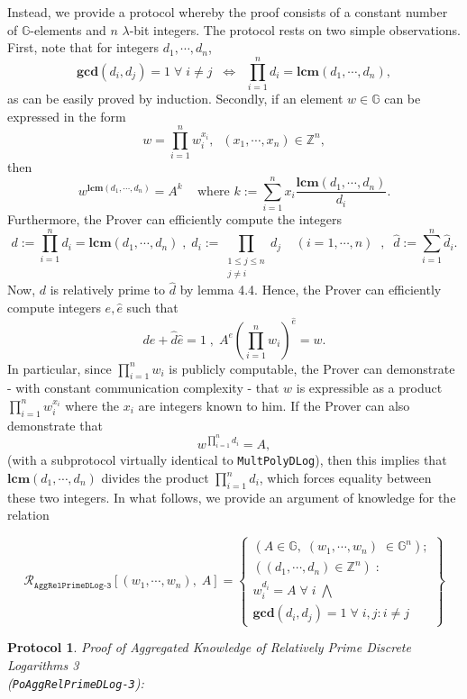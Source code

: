 \documentclass[11pt, lettersize, notitlepage, leqno, footskip=0.6cm]{article}
\newcommand{\bz}{\mathbb Z}
\newcommand{\pl}{\prod\limits}
\newcommand{\slim}{\sum\limits}
\newcommand{\ttt}{\texttt}
\newcommand{\LRA}{\Longleftrightarrow}
\newcommand{\mc}{\mathcal}
\newcommand{\mb}{\mathbb}
\newcommand{\mbf}{\mathbf}
\newcommand{\lam}{\lambda}
\newcommand{\what}{\widehat}
\newcommand{\vs}{\vspace{-0.15cm}}
\newcommand{\LCM}{\mbf{lcm}}
\newcommand{\GCD}{\mbf{gcd}}
\newtheorem{Prot}[Thm]{Protocol}
\numberwithin{equation}{section}
\begin{document}
Instead, we provide a protocol whereby the proof consists of a constant number of $\mb{G}$-elements and $n$ $\lam$-bit integers. The protocol rests on two simple observations. First, note that for integers $d_1,\cdots,d_n$, \vs $$\GCD(d_i,d_j)=1\;\forall\;i\neq j\;\; \LRA\;\; \pl_{i=1}^n d_i= \LCM(d_1,\cdots,d_n),$$ as can be easily proved by induction. Secondly, if an element $w\in \mb{G}$ can be expressed in the form \vspace{-0.15cm}$$w = \prod\limits_{i=1}^n w_i^{x_i},\;\;(x_1,\cdots,x_n)\in\bz^n,$$ then \vs $$w^{\LCM(d_1,\cdots,d_n)} = A^{k} \;\;\;\text{ where } k := \slim_{i=1}^n x_i\frac{\LCM(d_1,\cdots,d_n)}{d_i}.$$ Furthermore, the Prover can efficiently compute the integers \vs $$d:= \pl_{i=1}^n d_i = \LCM(d_1,\cdots,d_n)\;,\;\what{d}_i:= \pl_{\substack{1\leq j\leq n\\ j\neq i}} d_j\;\;\;\; (i=1,\cdots,n)\;\;,\;\; \what{d} := \slim_{i=1}^n \what{d}_i.$$ Now, $d$ is relatively prime to $\what{d}$ by lemma 4.4. Hence, the Prover can efficiently compute integers $e,\what{e}$ such that $$de+\what{d}\what{e} = 1\;,\; A^e(\pl_{i=1}^n w_i)^{\what{e}} = w.  $$ In particular, since $\pl_{i=1}^n w_i$ is publicly computable, the Prover can demonstrate - with constant communication complexity - that $w$ is expressible as a product $\pl_{i=1}^n w_i^{x_i}$ where the $x_i$ are integers known to him. If the Prover can also demonstrate that $$w^{\prod\limits_{i=1}^n d_i} = A,$$ (with a subprotocol virtually identical to \verb|MultPolyDLog|), then this implies that $\LCM(d_1,\cdots,d_n)$ divides the product $\pl_{i=1}^n d_i$, which forces equality between these two integers. In what follows, we provide an argument of knowledge for the relation 

\[
  \mc{R}_{\ttt{AggRelPrimeDLog-3}}[(w_1,\cdots, w_n),\; A] = \left\{\begin{array}{l}
    (A\in\mb{G},\; (w_1,\cdots, w_n)\;\in\mb{G}^n);\\
    ((d_1,\cdots,d_n)\in\bz^n)\;: \\
    w_i^{d_i} = A\;\forall\; i\;\bigwedge\\
   	\GCD(d_i, d_j) = 1\;\forall \;i,j: i\neq j
  \end{array}\right\}
\] 

\vspace{0.1cm}



\begin{Prot} \normalfont \hypertarget{RP3}{\textit{Proof of Aggregated Knowledge of Relatively Prime Discrete Logarithms} 3}\\ (\verb|PoAggRelPrimeDLog-3|):\end{Prot} \vspace{-0.3cm}
\end{document}
